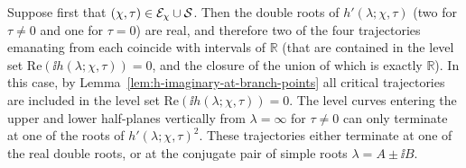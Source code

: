 Suppose first that $(\chi,\tau)\in \mathcal{E}_\chi\cup \mathcal{S}$.  Then the double roots of $h'(\lambda;\chi,\tau)$ (two for $\tau\neq 0$ and one for $\tau=0$) are real, and therefore two of the four trajectories emanating from each coincide with intervals of $\mathbb{R}$ (that are contained in the level set $\mathrm{Re}(\ii h(\lambda;\chi,\tau))=0$, and the closure of the union of which is exactly $\mathbb{R}$).  In this case, by Lemma~\ref{lem:h-imaginary-at-branch-points} all critical trajectories are included in the level set $\mathrm{Re}(\ii h(\lambda;\chi,\tau))=0$.  The level curves entering the upper and lower half-planes vertically from $\lambda=\infty$ for $\tau\neq 0$ can only terminate at one of the roots of $h'(\lambda;\chi,\tau)^2$.  These trajectories either terminate at one of the real double roots, or at the conjugate pair of simple roots $\lambda=A\pm\ii B$.  
